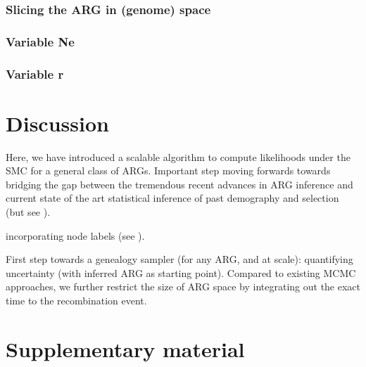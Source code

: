 \documentclass{article}
\begin{document}
\subsubsection{Slicing the ARG in (genome) space}

\subsubsection{Variable Ne}

\subsubsection{Variable r}


\section{Discussion}
Here, we have introduced a scalable algorithm to compute likelihoods 
under the SMC for a general class of ARGs. 
Important step moving forwards towards bridging the gap between the tremendous 
recent advances in ARG inference and current state of the art statistical inference of 
past demography and selection (but see ). %



incorporating node labels (see \citep{guo_recombination-aware_2022}).


First step towards a genealogy sampler (for any ARG, and at scale): 
quantifying uncertainty 
(with inferred ARG as starting point). Compared to existing MCMC approaches, 
we further restrict the size of ARG space by 
integrating out the exact time to the recombination event.






\section{Supplementary material}
\end{document}

